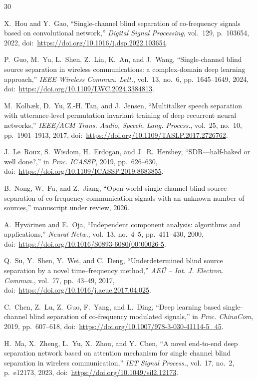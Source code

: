 \documentclass[review,12pt]{elsarticle}
\begin{document}
\begin{thebibliography}{30}\footnotesize

X.~Hou and Y.~Gao,
``Single-channel blind separation of co-frequency signals based on
convolutional network,''
\emph{Digital Signal Processing}, vol.~129, p.~103654, 2022,
doi:~\url{https://doi.org/10.1016/j.dsp.2022.103654}.

P.~Guo, M.~Yu, L.~Shen, Z.~Lin, K.~An, and J.~Wang,
``Single-channel blind source separation in wireless communications: a
complex-domain deep learning approach,''
\emph{IEEE Wireless Commun. Lett.}, vol.~13, no.~6, pp.~1645--1649,
2024, doi:~\url{https://doi.org/10.1109/LWC.2024.3384813}.

M.~Kolb{\ae}k, D.~Yu, Z.-H. Tan, and J.~Jensen,
``Multitalker speech separation with utterance-level permutation
invariant training of deep recurrent neural networks,''
\emph{IEEE/ACM Trans. Audio, Speech, Lang. Process.}, vol.~25, no.~10,
pp.~1901--1913, 2017,
doi:~\url{https://doi.org/10.1109/TASLP.2017.2726762}.

J.~Le~Roux, S.~Wisdom, H.~Erdogan, and J.~R.~Hershey,
``SDR---half-baked or well done?,''
in \emph{Proc. ICASSP}, 2019, pp.~626--630,
doi:~\url{https://doi.org/10.1109/ICASSP.2019.8683855}.

B.~Nong, W.~Fu, and Z.~Jiang,
``Open-world single-channel blind source separation of co-frequency
communication signals with an unknown number of sources,''
manuscript under review, 2026.

A.~Hyv{\"a}rinen and E.~Oja,
``Independent component analysis: algorithms and applications,''
\emph{Neural Netw.}, vol.~13, no.~4--5, pp.~411--430, 2000,
doi:~\url{https://doi.org/10.1016/S0893-6080(00)00026-5}.

Q.~Su, Y.~Shen, Y.~Wei, and C.~Deng,
``Underdetermined blind source separation by a novel time--frequency
method,''
\emph{AE\"U -- Int. J. Electron. Commun.}, vol.~77, pp.~43--49, 2017,
doi:~\url{https://doi.org/10.1016/j.aeue.2017.04.025}.

C.~Chen, Z.~Lu, Z.~Guo, F.~Yang, and L.~Ding,
``Deep learning based single-channel blind separation of co-frequency
modulated signals,''
in \emph{Proc. ChinaCom}, 2019, pp.~607--618,
doi:~\url{https://doi.org/10.1007/978-3-030-41114-5_45}.

H.~Ma, X.~Zheng, L.~Yu, X.~Zhou, and Y.~Chen,
``A novel end-to-end deep separation network based on attention
mechanism for single channel blind separation in wireless
communication,''
\emph{IET Signal Process.}, vol.~17, no.~2, p.~e12173, 2023,
doi:~\url{https://doi.org/10.1049/sil2.12173}.


\end{thebibliography}
\end{document}
